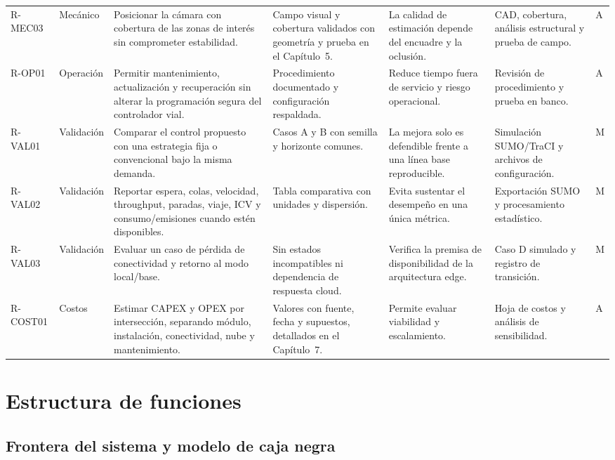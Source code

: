 \begin{landscape}
\begin{longtable}{@{}p{1.15cm}p{1.7cm}p{5.1cm}p{3.1cm}p{4.2cm}p{3.6cm}p{1.0cm}@{}}
R-MEC03 & Mecánico & Posicionar la cámara con cobertura de las zonas de interés sin comprometer estabilidad. & Campo visual y cobertura validados con geometría y prueba en el Capítulo~5. & La calidad de estimación depende del encuadre y la oclusión. & CAD, cobertura, análisis estructural y prueba de campo. & A\\
R-OP01 & Operación & Permitir mantenimiento, actualización y recuperación sin alterar la programación segura del controlador vial. & Procedimiento documentado y configuración respaldada. & Reduce tiempo fuera de servicio y riesgo operacional. & Revisión de procedimiento y prueba en banco. & A\\
R-VAL01 & Validación & Comparar el control propuesto con una estrategia fija o convencional bajo la misma demanda. & Casos A y B con semilla y horizonte comunes. & La mejora solo es defendible frente a una línea base reproducible. & Simulación SUMO/TraCI y archivos de configuración. & M\\
R-VAL02 & Validación & Reportar espera, colas, velocidad, throughput, paradas, viaje, ICV y consumo/emisiones cuando estén disponibles. & Tabla comparativa con unidades y dispersión. & Evita sustentar el desempeño en una única métrica. & Exportación SUMO y procesamiento estadístico. & M\\
R-VAL03 & Validación & Evaluar un caso de pérdida de conectividad y retorno al modo local/base. & Sin estados incompatibles ni dependencia de respuesta cloud. & Verifica la premisa de disponibilidad de la arquitectura edge. & Caso D simulado y registro de transición. & M\\
R-COST01 & Costos & Estimar CAPEX y OPEX por intersección, separando módulo, instalación, conectividad, nube y mantenimiento. & Valores con fuente, fecha y supuestos, detallados en el Capítulo~7. & Permite evaluar viabilidad y escalamiento. & Hoja de costos y análisis de sensibilidad. & A\\
\end{longtable}
\end{landscape}

\section{Estructura de funciones}\label{sec:estructura-funciones}

\subsection{Frontera del sistema y modelo de caja negra}\label{sec:caja-negra}

